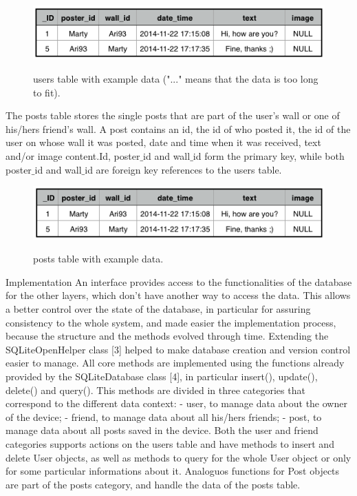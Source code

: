 \documentclass{report}
\newcommand{\lfig}[1]{\label{fig:#1}}
\begin{document}
\begin{figure}[H]
	\centering
    \includegraphics[width=\columnwidth]{users_table_example.png}
    \lfig{users_table_example}
    \vspace{-5mm} %
	\caption{users table with example data ("..." means that the data is too long to fit).}
\end{figure}

The posts table stores the single posts that are part of the user's wall or one of his/hers friend's wall. 
A post contains an id, the id of who posted it, the id of the user on whose wall it was posted, date and time when it was received, text and/or image content.Id, poster$\_$id and wall$\_$id form the primary key, while both poster$\_$id and wall$\_$id are foreign key references to the users table.

\begin{figure}[H]
	\centering
    \includegraphics[width=\columnwidth]{post_table_example.png}
    \lfig{post_table_example}
    \vspace{-5mm} %
	\caption{posts table with example data.}
\end{figure}

Implementation
An interface provides access to the functionalities of the database for the other layers, which don't have another way to access the data. This allows a better control over the state of the database, in particular for assuring consistency to the whole system, and made easier the implementation process, because the structure and the methods evolved through time.
Extending the SQLiteOpenHelper class [3] helped to make database creation and version control easier to manage.
All core methods are implemented using the functions already provided by the SQLiteDatabase class [4], in particular insert(), update(), delete() and query(). This methods are divided in three categories that correspond to the different data context:
- user, to manage data about the owner of the device;
- friend, to manage data about all his/hers friends;
- post, to manage data about all posts saved in the device.
Both the user and friend categories supports actions on the users table and have methods to insert and delete User objects, as well as methods to query for the whole User object or only for some particular informations about it.
Analoguos functions for Post objects are part of the posts category, and handle the data of the posts table.
\end{document}
